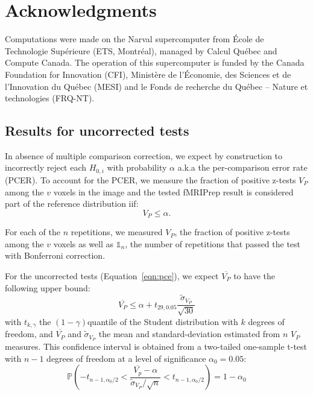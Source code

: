 \documentclass{article}
\newcommand{\fmriprep}{fMRIPrep\xspace}
\begin{document}
\section{Acknowledgments}

Computations were made on the Narval supercomputer from \'Ecole de Technologie
Sup\'erieure (ETS, Montr\'eal), managed by Calcul Québec and Compute Canada. The
operation of this supercomputer is funded by the Canada Foundation for
Innovation (CFI), Ministère de l’Économie, des Sciences et de l’Innovation du
Québec (MESI) and le Fonds de recherche du Québec – Nature et technologies
(FRQ-NT).


\begin{appendices}
    \section{Results for uncorrected tests}
    \label{appendix:multiple-comparison-tests}

    In absence of multiple comparison correction, we expect
    by construction to incorrectly reject each $H_{0,i}$ with probability $\alpha$ a.k.a
    the per-comparison error rate (PCER). To account for the PCER, we measure the
    fraction of positive z-tests $V_P$ among the $v$ voxels in the image and the
    tested \fmriprep result is considered part of the reference distribution iif:
    \begin{equation}
        V_{P} \leq \alpha.
        \label{eqn:pce}
    \end{equation}

    For each of the $n$ repetitions,
    we measured $V_P$, the fraction of
    positive z-tests among the $v$ voxels as well as $\mathds{1}_n$, the number of repetitions
    that passed the test with Bonferroni correction.

    For the uncorrected tests (Equation~\ref{eqn:pce}), we expect $\overline{V_P}$ to have
    the following upper bound:
    \[
        \overline{V_P} \leq
        \alpha  + t_{29,0.05} \frac{\tilde{\sigma}_{V_P}}{\sqrt{30}}
    \]
    with
    $t_{k,\gamma}$ the $(1-\gamma)$quantile of the Student distribution with $k$ degrees of freedom,
    and $\overline{V_P}$ and $\tilde{\sigma}_{V_P}$ the mean and standard-deviation estimated from
    $n$ $V_P$ measures.
    This confidence interval is obtained from a two-tailed one-sample
    t-test with $n-1$ degrees of freedom at a level of significance $\alpha_0=0.05$:
    \[
        \mathbb{P}
        \left(
        -t_{n-1,\alpha_0/2}
        <
        \dfrac{\overline{V_p} - \alpha}{\tilde{\sigma}_{V_P} / \sqrt{n}}
        <
        t_{n-1,\alpha_0/2}
        \right)
        = 1 - \alpha_0
    \]


\end{appendices}
\end{document}
